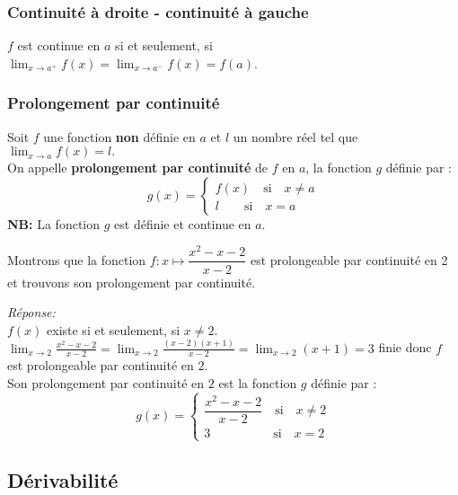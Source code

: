 \subsubsection*{ Continuité à droite - continuité à gauche}
\begin{property}
$ f $ est continue en $ a $ si et seulement, si  $\displaystyle \lim_{x \to a^{+}}f(x)=\displaystyle\lim_{x \to a^{-}}f(x)=f(a) $. 
\end{property}
\subsubsection*{Prolongement par continuité}
\begin{definition}
Soit $ f $ une fonction  \textbf{non}  définie en $ a $ et $ l $ un nombre réel tel que $ \displaystyle\lim_{x \to a}f(x)=l. $\\
On appelle \textbf{prolongement par continuité } de $ f $ en $ a $, la fonction $ g $ définie par :
\[ g (x)=\left\{\begin{array}{l} f(x)\quad \textrm{si} \quad x\neq a \\ l                      \quad \quad \textrm{si}\quad x= a  \end{array} \right.\]
\textbf{NB:} La fonction $ g $ est définie et continue en $ a $.
\end{definition}
\begin{example}
Montrons que la fonction $ f: x \mapsto \dfrac{x^{2}-x-2}{x-2} $   est prolongeable par continuité en 2 et trouvons son prolongement par continuité.
\end{example}

\textsl{Réponse:}\\
$ f(x) $ existe si et seulement, si $ x\neq 2 $.\\  $\displaystyle\lim_{x \to 2 }\frac{x^{2}-x-2}{x-2}=\displaystyle\lim_{x \to 2 }\frac{(x-2)(x+1)}{x-2}= \displaystyle\lim_{x \to 2 }(x+1)=3 $   finie donc $ f $ est prolongeable par continuité en $ 2. $\\
Son prolongement par continuité en $ 2$ est la fonction $ g $ définie par : 
\[ g (x)=\left\{\begin{array}{l} \dfrac{x^{2}-x-2}{x-2} \quad \textrm{si} \quad x\neq 2 \\ 3\quad \quad \qquad \quad  \textrm{si}\quad x= 2  \end{array} \right.\]

\subsection{Dérivabilité}
